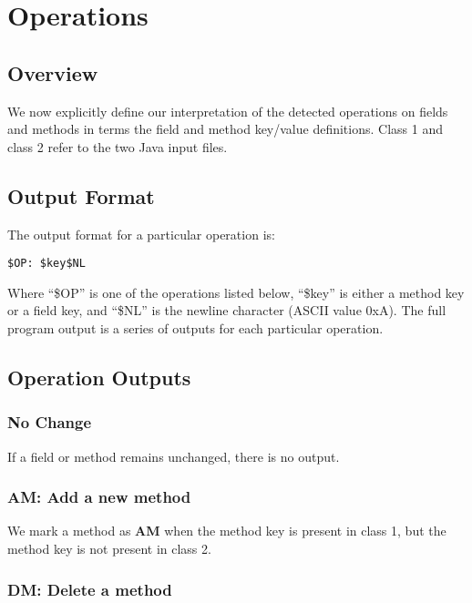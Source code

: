 \chapter{Operations}

\section{Overview}

We now explicitly define our interpretation of the detected operations on fields
and methods in terms the field and method key/value definitions. Class 1 and
class 2 refer to the two Java input files.

\section{Output Format}

The output format for a particular operation is:\\

\begin{lstlisting}[frame=single]
$OP: $key$NL
\end{lstlisting}


Where ``\$OP'' is one of the operations listed below, ``\$key'' is either
a method key or a field key, and ``\$NL'' is the newline character (ASCII value
0xA). The full program output is a series of outputs for each particular
operation.

\section{Operation Outputs}

\subsection{No Change}

If a field or method remains unchanged, there is no output.

\subsection{AM: Add a new method}

We mark a method as \textbf{AM} when the method key is present in class 1,
but the method key is not present in class 2.

\subsection{DM: Delete a method}

